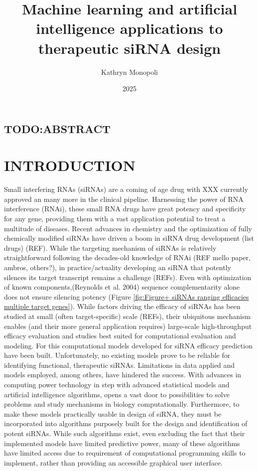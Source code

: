\documentclass{report}
\title{Machine learning and artificial intelligence applications to therapeutic siRNA design}
\author{Kathryn Monopoli }
\date{2025}
\begin{document}
\maketitle

\tableofcontents


\section{TODO:ABSTRACT}




\chapter{INTRODUCTION}

Small interfering RNAs (siRNAs) are a coming of age drug with XXX currently approved an many more in the clinical pipeline. Harnessing the power of RNA interference (RNAi), these small RNA drugs have great potency and specificity for any gene, providing them with a vast application potential to treat a multitude of diseases. Recent advances in chemistry and the optimization of fully chemically modified siRNAs have driven a boom in siRNA drug development (list drugs) (REF). While the targeting mechanism of siRNAs is relatively straightforward following the decades-old knowledge of RNAi (REF mello paper, ambros, others?), in practice/actuality developing an siRNA that potently silences its target transcript remains a challenge (REFs). Even with optimization of known components,(Reynolds et al. 2004) sequence complementarity alone does not ensure silencing potency (Figure \ref{fig:Figure+ siRNAs ranging efficacies multiple target genes}). While factors driving the efficacy of siRNAs has been studied at small (often target-specific) scale (REFs), their ubiquitous mechanism enables (and their more general application requires) large-scale high-throughput efficacy evaluation and studies best suited for computational evaluation and modeling. For this computational models developed for siRNA efficacy prediction have been built. Unfortunately, no existing models prove to be reliable for identifying functional, therapeutic siRNAs. Limitations in data applied and models employed, among others, have hindered the success. With advances in computing power technology in step with advanced statistical models and artificial intelligence algorithms, opens a vast door to possibilities to solve problems and study mechanisms in biology computationally. Furthermore, to make these models practically usable in design of siRNA, they must be incorporated into algorithms purposely built for the design and identification of potent siRNAs. While such algorithms exist, even excluding the fact that their implemented models have limited predictive power, many of these algorithms have limited access due to requirement of computational programming skills to implement, rather than providing an accessible graphical user interface. 
\end{document}
